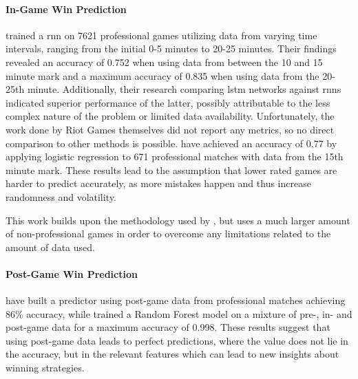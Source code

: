 \documentclass[12pt, a4paper, headinclude, twoside, plainheadsepline, open=right, numbers=noenddot, hidelinks, toc=listof, toc=bibliography]{scrreprt}
\begin{document}
\paragraph{In-Game Win Prediction}
 \cite{silvaContinuousOutcomePrediction2018} trained a \acf{rnn} on 7621 professional games  utilizing data from varying time intervals, ranging from the initial 0-5 minutes to 20-25 minutes.
Their findings revealed an accuracy of 0.752 when using data from between the 10 and 15 minute mark and a maximum accuracy of 0.835 when using data from the 20-25th minute.
Additionally, their research comparing \ac{lstm} networks against \acp{rnn} indicated superior performance of the latter, possibly attributable to the less complex nature of the problem or limited data availability.
Unfortunately, the work done by Riot Games themselves \cite{claytorRiotGamesAWS2023} did not report any metrics, so no direct comparison to other methods is possible.
\citeauthor{baileyStatisticalLearningEsports} \cite{baileyStatisticalLearningEsports} have achieved an accuracy of 0.77 by applying logistic regression to 671 professional matches with data from the 15th minute mark.
These results lead to the assumption that lower rated games are harder to predict accurately, as more mistakes happen and thus increase randomness and volatility.

This work builds upon the methodology used by   \cite{silvaContinuousOutcomePrediction2018}, but uses a much larger amount of non-professional games in order to overcome any limitations related to the amount of data used.

\paragraph{Post-Game Win Prediction}
\citeauthor{bahrololloomiESportsPlayerPerformance2023} \cite{bahrololloomiESportsPlayerPerformance2023} have built a predictor using post-game data from professional matches achieving 86\% accuracy, while \citeauthor{aniVictoryPredictionLeague2019} \cite{aniVictoryPredictionLeague2019} trained a Random Forest model on a mixture of pre-, in- and post-game data for a maximum accuracy of 0.998.
These results suggest that using post-game data leads to perfect predictions, where the value does not lie in the accuracy, but in the relevant features which can lead to new insights about winning strategies.
\end{document}
